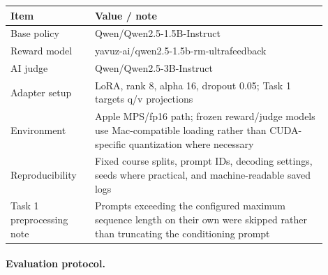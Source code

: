 \documentclass{article}
\begin{document}
%

\begin{center}
\label{tab:setup}
\small
\setlength{\tabcolsep}{5pt}
\begin{tabular}{p{0.24\linewidth}p{0.66\linewidth}}
\toprule
Item & Value / note \\
\midrule
Base policy
& Qwen/Qwen2.5-1.5B-Instruct \\

Reward model
& yavuz-ai/qwen2.5-1.5b-rm-ultrafeedback \\

AI judge
& Qwen/Qwen2.5-3B-Instruct \\

Adapter setup
& LoRA, rank 8, alpha 16, dropout 0.05; Task 1 targets q/v projections \\

Environment
& Apple MPS/fp16 path; frozen reward/judge models use Mac-compatible loading rather than CUDA-specific quantization where necessary \\

Reproducibility
& Fixed course splits, prompt IDs, decoding settings, seeds where practical, and machine-readable saved logs \\

Task 1 preprocessing note
& Prompts exceeding the configured maximum sequence length on their own were skipped rather than truncating the conditioning prompt \\

\bottomrule
\end{tabular}
\end{center}


\paragraph{Evaluation protocol.}

%
%
\end{document}
